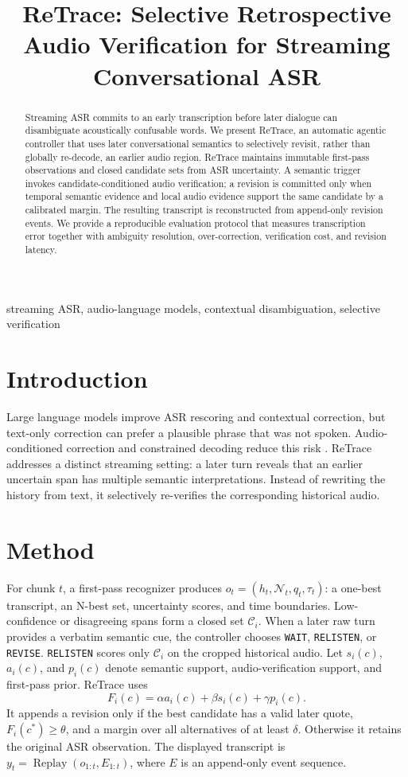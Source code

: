 \documentclass[conference]{IEEEtran}
\title{ReTrace: Selective Retrospective Audio Verification for Streaming Conversational ASR}
\author{\IEEEauthorblockN{Anonymous Authors}\IEEEauthorblockA{Paper under double-blind review}}
\begin{document}
\maketitle
\begin{abstract}
Streaming ASR commits to an early transcription before later dialogue can disambiguate acoustically confusable words. We present ReTrace, an automatic agentic controller that uses later conversational semantics to selectively revisit, rather than globally re-decode, an earlier audio region. ReTrace maintains immutable first-pass observations and closed candidate sets from ASR uncertainty. A semantic trigger invokes candidate-conditioned audio verification; a revision is committed only when temporal semantic evidence and local audio evidence support the same candidate by a calibrated margin. The resulting transcript is reconstructed from append-only revision events. We provide a reproducible evaluation protocol that measures transcription error together with ambiguity resolution, over-correction, verification cost, and revision latency.
\end{abstract}
\begin{IEEEkeywords}streaming ASR, audio-language models, contextual disambiguation, selective verification\end{IEEEkeywords}
\section{Introduction}
Large language models improve ASR rescoring and contextual correction, but text-only correction can prefer a plausible phrase that was not spoken. Audio-conditioned correction and constrained decoding reduce this risk \cite{seal,strescoring}. ReTrace addresses a distinct streaming setting: a later turn reveals that an earlier uncertain span has multiple semantic interpretations. Instead of rewriting the history from text, it selectively re-verifies the corresponding historical audio.
\section{Method}
For chunk $t$, a first-pass recognizer produces $o_t=(h_t,\mathcal{N}_t,q_t,\tau_t)$: a one-best transcript, an N-best set, uncertainty scores, and time boundaries. Low-confidence or disagreeing spans form a closed set $\mathcal{C}_i$. When a later raw turn provides a verbatim semantic cue, the controller chooses \texttt{WAIT}, \texttt{RELISTEN}, or \texttt{REVISE}. \texttt{RELISTEN} scores only $\mathcal{C}_i$ on the cropped historical audio. Let $s_i(c)$, $a_i(c)$, and $p_i(c)$ denote semantic support, audio-verification support, and first-pass prior. ReTrace uses
\begin{equation}
F_i(c)=\alpha a_i(c)+\beta s_i(c)+\gamma p_i(c).
\end{equation}
It appends a revision only if the best candidate has a valid later quote, $F_i(c^*)\geq\theta$, and a margin over all alternatives of at least $\delta$. Otherwise it retains the original ASR observation. The displayed transcript is $y_t=\operatorname{Replay}(o_{1:t},E_{1:t})$, where $E$ is an append-only event sequence.
\end{document}
